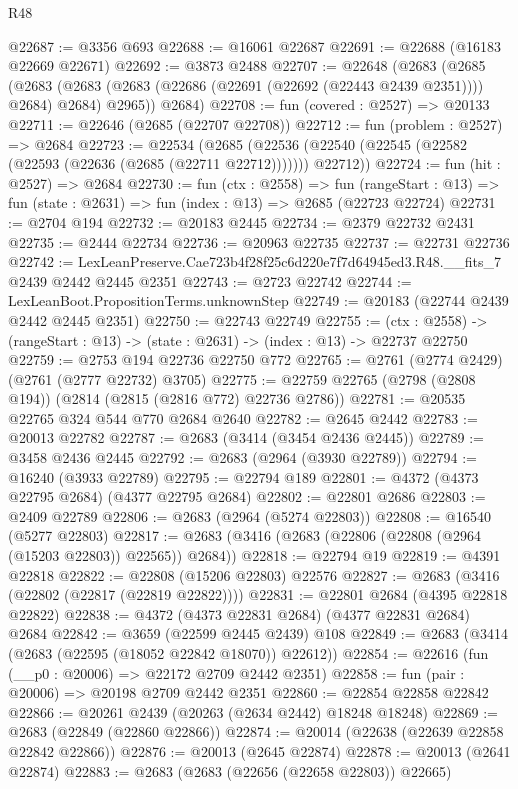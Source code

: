\begin{lexlean}{R48}
\begin{coremodule}
@22687 := @3356 @693
@22688 := @16061 @22687
@22691 := @22688 (@16183 @22669 @22671)
@22692 := @3873 @2488
@22707 := @22648
    (@2683
      (@2685
        (@2683 (@2683 (@2683 (@22686 (@22691 (@22692 (@22443 @2439 @2351)))) @2684) @2684) @2965))
      @2684)
@22708 := fun (covered : @2527) => @20133
@22711 := @22646 (@2685 (@22707 @22708))
@22712 := fun (problem : @2527) => @2684
@22723 := @22534
    (@2685 (@22536 (@22540 (@22545 (@22582 (@22593 (@22636 (@2685 (@22711 @22712))))))) @22712))
@22724 := fun (hit : @2527) => @2684
@22730 := fun (ctx : @2558) =>
  fun (rangeStart : @13) => fun (state : @2631) => fun (index : @13) => @2685 (@22723 @22724)
@22731 := @2704 @194
@22732 := @20183 @2445
@22734 := @2379 @22732 @2431
@22735 := @2444 @22734
@22736 := @20963 @22735
@22737 := @22731 @22736
@22742 := LexLeanPreserve.Cae723b4f28f25c6d220e7f7d64945ed3.R48.__fits_7 @2439 @2442 @2445 @2351
@22743 := @2723 @22742
@22744 := LexLeanBoot.PropositionTerms.unknownStep
@22749 := @20183 (@22744 @2439 @2442 @2445 @2351)
@22750 := @22743 @22749
@22755 := (ctx : @2558) -> (rangeStart : @13) -> (state : @2631) -> (index : @13) -> @22737 @22750
@22759 := @2753 @194 @22736 @22750 @772
@22765 := @2761 (@2774 @2429) (@2761 (@2777 @22732) @3705)
@22775 := @22759 @22765 (@2798 (@2808 @194)) (@2814 (@2815 (@2816 @772) @22736 @2786))
@22781 := @20535 @22765 @324 @544 @770 @2684 @2640
@22782 := @2645 @2442
@22783 := @20013 @22782
@22787 := @2683 (@3414 (@3454 @2436 @2445))
@22789 := @3458 @2436 @2445
@22792 := @2683 (@2964 (@3930 @22789))
@22794 := @16240 (@3933 @22789)
@22795 := @22794 @189
@22801 := @4372 (@4373 @22795 @2684) (@4377 @22795 @2684)
@22802 := @22801 @2686
@22803 := @2409 @22789
@22806 := @2683 (@2964 (@5274 @22803))
@22808 := @16540 (@5277 @22803)
@22817 := @2683 (@3416 (@2683 (@22806 (@22808 (@2964 (@15203 @22803)) @22565)) @2684))
@22818 := @22794 @19
@22819 := @4391 @22818
@22822 := @22808 (@15206 @22803) @22576
@22827 := @2683 (@3416 (@22802 (@22817 (@22819 @22822))))
@22831 := @22801 @2684 (@4395 @22818 @22822)
@22838 := @4372 (@4373 @22831 @2684) (@4377 @22831 @2684) @2684
@22842 := @3659 (@22599 @2445 @2439) @108
@22849 := @2683 (@3414 (@2683 (@22595 (@18052 @22842 @18070)) @22612))
@22854 := @22616 (fun (__p0 : @20006) => @22172 @2709 @2442 @2351)
@22858 := fun (pair : @20006) => @20198 @2709 @2442 @2351
@22860 := @22854 @22858 @22842
@22866 := @20261 @2439 (@20263 (@2634 @2442) @18248 @18248)
@22869 := @2683 (@22849 (@22860 @22866))
@22874 := @20014 (@22638 (@22639 @22858 @22842 @22866))
@22876 := @20013 (@2645 @22874)
@22878 := @20013 (@2641 @22874)
@22883 := @2683 (@2683 (@22656 (@22658 @22803)) @22665)

\end{coremodule}
\end{lexlean}
